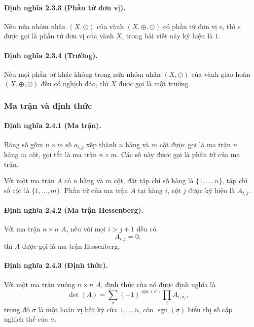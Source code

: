\documentclass[11pt]{article}
\begin{document}
\paragraph{Định nghĩa 2.3.3 (Phần tử đơn vị).}
Nếu nửa nhóm nhân \((X,\odot)\) của vành \((X,\oplus,\odot)\) có phần tử đơn vị
\(e\), thì \(e\) được gọi là phần tử đơn vị của vành \(X\), trong bài viết này
ký hiệu là \(1\).

\paragraph{Định nghĩa 2.3.4 (Trường).}
Nếu mọi phần tử khác không trong nửa nhóm nhân \((X,\odot)\) của vành giao hoán
\((X,\oplus,\odot)\) đều có nghịch đảo, thì \(X\) được gọi là một trường.

\subsubsection{Ma trận và định thức}

\paragraph{Định nghĩa 2.4.1 (Ma trận).}
Bảng số gồm \(n\times m\) số \(a_{i,j}\) xếp thành \(n\) hàng và \(m\) cột được
gọi là ma trận \(n\) hàng \(m\) cột, gọi tắt là ma trận \(n\times m\). Các số
này được gọi là phần tử của ma trận.

Với một ma trận \(A\) có \(n\) hàng và \(m\) cột, đặt tập chỉ số hàng là
\(\{1,\ldots,n\}\), tập chỉ số cột là \(\{1,\ldots,m\}\). Phần tử của ma trận
\(A\) tại hàng \(i\), cột \(j\) được ký hiệu là \(A_{i,j}\).

\paragraph{Định nghĩa 2.4.2 (Ma trận Hessenberg).}
Với ma trận \(n\times n\) \(A\), nếu với mọi \(i>j+1\) đều có
\[
  A_{i,j}=0,
\]
thì \(A\) được gọi là ma trận Hessenberg.

\paragraph{Định nghĩa 2.4.3 (Định thức).}
Với một ma trận vuông \(n\times n\) \(A\), định thức của nó được định nghĩa là
\[
  \det(A)=\sum_\sigma (-1)^{\operatorname{sgn}(\sigma)}
  \prod_i A_{i,\sigma_i},
\]
trong đó \(\sigma\) là một hoán vị bất kỳ của \(1,\ldots,n\), còn
\(\operatorname{sgn}(\sigma)\) biểu thị số cặp nghịch thế của \(\sigma\).
\end{document}
